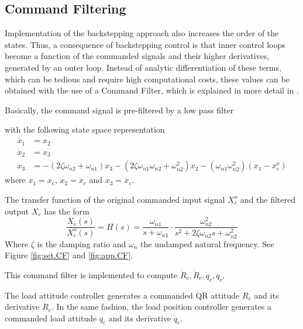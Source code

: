 \subsection{Command Filtering}
Implementation of the backstepping approach also increases the order of the states. Thus, a consequence of backstepping control is that inner control loops become a function of the commanded signals and their higher derivatives, generated by an outer loop.
Instead of analytic differentiation of these terms, which can be tedious and require high computational costs, these values can be obtained with the use of a Command Filter, which is explained in more detail in \cite{Farrell2008}.

Basically, the command signal is pre-filtered by a low pass filter 

with the following state space representation
\begin{align}\label{key}
\dot{x}_1 &= x_2\\ %
\dot{x}_2 &= x_3\\ %
\dot{x}_3 &= -(2\zeta \omega_{n2}+\omega_{n1})x_3-(2\zeta\omega_{n1}\omega_{n2}+\omega_{n2}^2)x_2-(\omega_{n1}\omega_{n2}^2)(x_1-x_c^o)
\end{align}
where $ x_1 = x_c$, $ x_2 = \dot{x}_c$ and $ x_3 = \ddot{x}_c$. 

The transfer function of the original commanded input signal $ X_c^o $ and the filtered output $ X_c $ has the form
\begin{equation}\label{key}
\frac{X_c(s)}{X_c^o(s)}=H(s)=\frac{\omega_{n1}}{s+\omega_{n1}}\cdot\frac{\omega_{n2}^2}{s^2+2\zeta\omega_{n2}s+\omega_{n2}^2}
\end{equation}
Where $ \zeta $ is the damping ratio and $ \omega_n $ the undamped natural frequency. See Figure \ref{fig:set.CF} and \ref{fig:app.CF}.

This command filter is implemented to compute $ \dot{R}_c, \ddot{R}_c,\dot{q}_c, \ddot{q}_c $.
%



The load attitude controller generates a commanded QR attitude $ R_c $ and its derivative $ \dot{R}_c $. In the same fashion, the load position controller generates a commanded load attitude $ q_c $ and its derivative $ \dot{q}_c $. 

